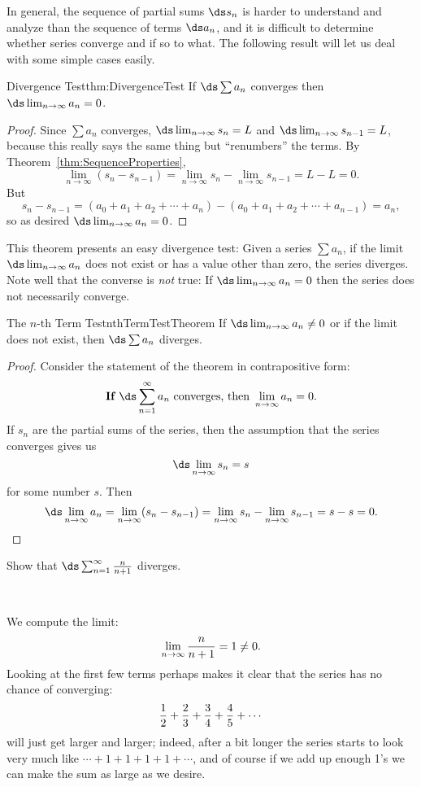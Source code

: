 In general, the sequence of partial sums $\ds s_n$ is harder to understand
and analyze than the sequence of terms $\ds a_n$, and it is difficult
to determine whether series converge and if so to what. The following result
will let us deal with some simple cases easily.

\begin{theorem}{Divergence Test}{thm:DivergenceTest}
If $\ds\sum a_n$ converges then $\ds\lim_{n\to\infty}a_n=0$.
\end{theorem}
\begin{proof}
Since $\sum a_n$ converges, $\ds\lim_{n\to\infty}s_n=L$ and 
$\ds\lim_{n\to\infty}s_{n-1}=L$, because this really says the same
thing but ``renumbers'' the terms. By Theorem~\ref{thm:SequenceProperties}, 
\[
  \lim_{n\to\infty} (s_{n}-s_{n-1})=
  \lim_{n\to\infty} s_{n}-\lim_{n\to\infty}s_{n-1}=L-L=0.
\]
But
\[
  s_{n}-s_{n-1}=(a_0+a_1+a_2+\cdots+a_n)-(a_0+a_1+a_2+\cdots+a_{n-1})
  =a_n,
\]
so as desired $\ds\lim_{n\to\infty}a_n=0$.
\end{proof}

This theorem presents an easy divergence test: Given a series $\sum
a_n$, if the limit $\ds\lim_{n\to\infty}a_n$ does not exist or has a value
other than zero, the series diverges. Note well that the converse is
\emph{not} true: If $\ds\lim_{n\to\infty}a_n=0$ then the series does
not necessarily converge.

\begin{theorem}{The $n$-th Term Test}{nthTermTestTheorem}
If $\ds\lim_{n\to\infty}a_n\neq 0$ or if the limit does not exist, then $\ds\sum a_n$ diverges.
\end{theorem}
\begin{proof}
Consider the statement of the theorem in contrapositive form:
\[\textbf{If }\ds\sum_{n=1}^{\infty}a_n\text{ converges, then }\lim_{n\to\infty}a_n=0.\]
If $s_n$ are the partial sums of the series, then the assumption that the series converges gives us
\[\ds\lim_{n\to\infty}s_n=s\]
for some number $s$. Then
\[\ds\lim_{n\to\infty}a_n=\lim_{n\to\infty}(s_n-s_{n-1})=\lim_{n\to\infty}s_n-\lim_{n\to\infty}s_{n-1}=s-s=0.\]
\end{proof}

\begin{example}{}{}
Show that $\ds\sum_{n=1}^\infty {n\over n+1}$ diverges.
\end{example}\
\begin{solution}
We compute the limit:
$$\lim _{n\to\infty}{n\over n+1}=1\not=0.$$
Looking at the first few terms perhaps makes it clear that the series
has no chance of converging:
$${1\over2}+{2\over3}+{3\over4}+{4\over5}+\cdots$$
will just get larger and larger; indeed, after a bit longer the series
starts to look very much like $\cdots+1+1+1+1+\cdots$, and of course
if we add up enough 1's we can make the sum as large as we desire.
\end{solution}

